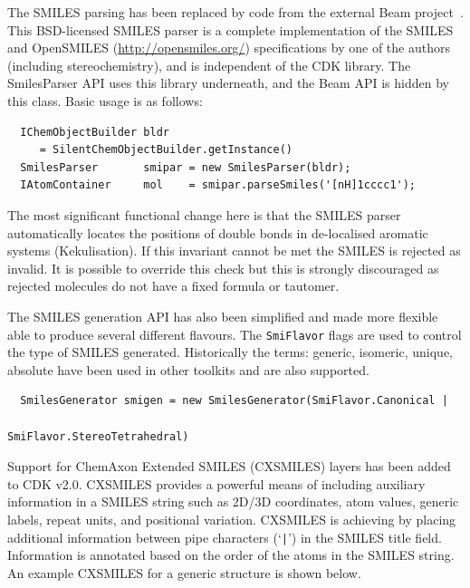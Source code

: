 \documentclass[doublespacing]{bmcart}
\def \cdkversion {v2.0}
\begin{document}
The SMILES parsing has been replaced by code from the external Beam project~\cite{Beam}.
This BSD-licensed SMILES parser is a complete implementation of the SMILES
and OpenSMILES (\url{http://opensmiles.org/}) specifications by one of the
authors (including stereochemistry), and is independent of
the CDK library. The SmilesParser API uses this library underneath, and the
Beam API is hidden by this class. Basic usage is as follows:

\vspace{0.2cm}
\begin{verbatim}
  IChemObjectBuilder bldr 
     = SilentChemObjectBuilder.getInstance()
  SmilesParser       smipar = new SmilesParser(bldr);
  IAtomContainer     mol    = smipar.parseSmiles('[nH]1cccc1');
\end{verbatim}
\vspace{0.2cm}

The most significant functional change here is that the SMILES parser automatically 
locates the positions of double bonds in de-localised aromatic systems (Kekulisation).
If this invariant cannot be met the SMILES is rejected as invalid. It is 
possible to override this check but this is strongly discouraged as rejected
molecules do not have a fixed formula or tautomer.

The SMILES generation API has also been simplified and made more flexible able 
to produce several different flavours. The \texttt{SmiFlavor} flags are used
to control the type of SMILES generated. Historically the terms: generic, 
isomeric, unique, absolute have been used in other toolkits and are also 
supported.

\vspace{0.2cm}
\begin{verbatim}
  SmilesGenerator smigen = new SmilesGenerator(SmiFlavor.Canonical |
                                               SmiFlavor.StereoTetrahedral)
\end{verbatim}
\vspace{0.2cm}

Support for ChemAxon Extended SMILES (CXSMILES)\cite{CXSMILES} layers has been added
to CDK \cdkversion{}. CXSMILES provides a powerful means of including auxiliary 
information in a SMILES string such as 2D/3D coordinates, atom values, generic labels, 
repeat units, and positional variation. CXSMILES is achieving by placing additional
information between pipe characters (`\texttt{|}') in the SMILES title field. Information
is annotated based on the order of the atoms in the SMILES string. An example CXSMILES
for a generic structure is shown below.
\end{document}
